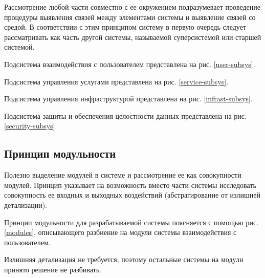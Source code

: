 Рассмотрение любой части совместно с ее окружением подразумевает проведение процедуры выявления связей между элементами системы и выявление связей со средой.
В соответствии с этим принципом систему в первую очередь следует рассматривать как часть другой системы, называемой суперсистемой или старшей системой.

Подсистема взаимодействия с пользователем представлена на рис. \ref{user-subsys}.

Подсистема управления услугами представлена на рис. \ref{service-subsys}.

Подсистема управления инфраструктурой представлена на рис. \ref{infrast-subsys}.

Подсистема защиты и обеспечения целостности данных представлена на рис. \ref{security-subsys}.

\subsection{Принцип модульности}

Полезно выделение модулей в системе и рассмотрение ее как совокупности модулей.
Принцип указывает на возможность вместо части системы исследовать совокупность ее входных и выходных воздействий (абстрагирование от излишней детализации).

Принцип модульности для разрабатываемой системы поясняется с помощью рис. \ref{modules}, описывающего разбиение на модули системы взаимодействия с пользователем.

Излишняя детализация не требуется, поэтому остальные системы на модули принято решение не разбивать.


\clearpage
